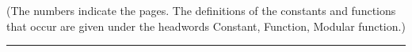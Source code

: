 
\begin{center}
\end{center}

\noindent(The numbers indicate the pages. The definitions of the constants and functions that occur are given under the headwords Constant, Function, Modular function.)

\begin{center}
\rule{2cm}{0.4pt}
\end{center}

